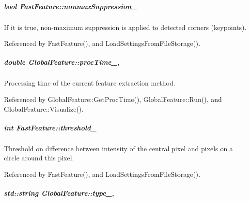 \hypertarget{group___feature_extractor_afc991a85e5ee2d8f1a52657eee8d380d}{
\subparagraph[{nonmax\-Suppression\-\_\-}]{\setlength{\rightskip}{0pt plus 5cm}bool Fast\-Feature\-::nonmax\-Suppression\-\_\-\hspace{0.3cm}{\ttfamily [private]}}}\label{group___feature_extractor_afc991a85e5ee2d8f1a52657eee8d380d}


If it is true, non-\/maximum suppression is applied to detected corners (keypoints). 



Referenced by Fast\-Feature(), and Load\-Settings\-From\-File\-Storage().

\hypertarget{group___feature_extractor_aa3306975b929f5503dac51829f9e04a0}{
\subparagraph[{proc\-Time\-\_\-}]{\setlength{\rightskip}{0pt plus 5cm}double Global\-Feature\-::proc\-Time\-\_\-\hspace{0.3cm}{\ttfamily [protected]}, {\ttfamily [inherited]}}}\label{group___feature_extractor_aa3306975b929f5503dac51829f9e04a0}


Processing time of the current feature extraction method. 



Referenced by Global\-Feature\-::\-Get\-Proc\-Time(), Global\-Feature\-::\-Run(), and Global\-Feature\-::\-Visualize().

\hypertarget{group___feature_extractor_afc261d12e34223dc377b1ea8f8d3a773}{
\subparagraph[{threshold\-\_\-}]{\setlength{\rightskip}{0pt plus 5cm}int Fast\-Feature\-::threshold\-\_\-\hspace{0.3cm}{\ttfamily [private]}}}\label{group___feature_extractor_afc261d12e34223dc377b1ea8f8d3a773}


Threshold on difference between intensity of the central pixel and pixels on a circle around this pixel. 



Referenced by Fast\-Feature(), and Load\-Settings\-From\-File\-Storage().

\hypertarget{group___feature_extractor_ad467857c4bc3d0fe65ba29e3b8f7c796}{
\subparagraph[{type\-\_\-}]{\setlength{\rightskip}{0pt plus 5cm}std\-::string Global\-Feature\-::type\-\_\-\hspace{0.3cm}{\ttfamily [protected]}, {\ttfamily [inherited]}}}\label{group___feature_extractor_ad467857c4bc3d0fe65ba29e3b8f7c796}



